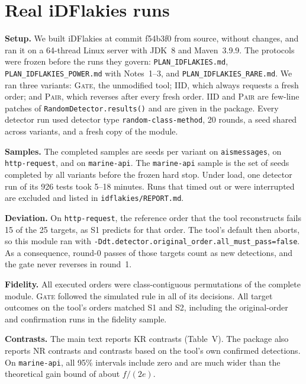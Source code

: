 \documentclass[11pt,a4paper]{article}
\theoremstyle{definition}\newtheorem{definition}[theorem]{Definition}
\theoremstyle{remark}\newtheorem{remark}[theorem]{Remark}
\theoremstyle{definition}\newtheorem{xexample}[xtheorem]{Example}\theoremstyle{plain}
\begin{document}
\section{Real iDFlakies runs}\label{sec:idflakies}
\textbf{Setup.} We built iDFlakies at commit f54b3f0 from source, without changes, and ran it on a 64-thread Linux server with JDK~8 and Maven~3.9.9. The protocols were frozen before the runs they govern: \texttt{PLAN\_IDFLAKIES.md}, \texttt{PLAN\_IDFLAKIES\_POWER.md} with Notes~1--3, and \texttt{PLAN\_IDFLAKIES\_RARE.md}. We ran three variants: \textsc{Gate}, the unmodified tool; \textsc{IID}, which always requests a fresh order; and \textsc{Pair}, which reverses after every fresh order. \textsc{IID} and \textsc{Pair} are few-line patches of \texttt{RandomDetector.results()} and are given in the package. Every detector run used detector type \texttt{random-class-method}, 20 rounds, a seed shared across variants, and a fresh copy of the module.

\textbf{Samples.} The completed samples are \IdfRunsAis{} seeds per variant on \texttt{aismessages}, \IdfRunsHttp{} on \texttt{http-request}, and \IdfRunsMarine{} on \texttt{marine-api}. The \texttt{marine-api} sample is the set of seeds completed by all variants before the frozen hard stop. Under load, one detector run of its 926 tests took 5--18 minutes. Runs that timed out or were interrupted are excluded and listed in \texttt{idflakies/REPORT.md}.

\textbf{Deviation.} On \texttt{http-request}, the reference order that the tool reconstructs fails 15 of the 25 targets, as S1 predicts for that order. The tool's default then aborts, so this module ran with \texttt{-Ddt.detector.original\_order.all\_must\_pass=false}. As a consequence, round-0 passes of those targets count as new detections, and the gate never reverses in round~1.

\textbf{Fidelity.} All \IdfOrders{} executed orders were class-contiguous permutations of the complete module. \textsc{Gate} followed the simulated rule in all \IdfGateTransitions{} of its decisions. All \IdfComparisons{} target outcomes on the tool's orders matched S1 and S2, including the original-order and confirmation runs in the fidelity sample.

\textbf{Contrasts.} The main text reports KR contrasts (Table~V). The package also reports NR contrasts and contrasts based on the tool's own confirmed detections. On \texttt{marine-api}, all 95\% intervals include zero and are much wider than the theoretical gain bound of about $f/(2e)$.
\end{document}
